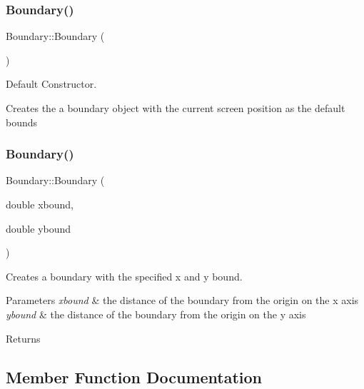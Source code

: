 \subsubsection{\texorpdfstring{Boundary()}{Boundary()}\hspace{0.1cm}{\footnotesize\ttfamily [1/2]}}
{\footnotesize\ttfamily Boundary\+::\+Boundary (\begin{DoxyParamCaption}{ }\end{DoxyParamCaption})}



Default Constructor. 

Creates the a boundary object with the current screen position as the default bounds \mbox{\label{class_boundary_a1ebdbcf1f4bfc6c98ec89e0f15754a59}} 
\subsubsection{\texorpdfstring{Boundary()}{Boundary()}\hspace{0.1cm}{\footnotesize\ttfamily [2/2]}}
{\footnotesize\ttfamily Boundary\+::\+Boundary (\begin{DoxyParamCaption}\item[{double}]{xbound,  }\item[{double}]{ybound }\end{DoxyParamCaption})}



Creates a boundary with the specified x and y bound. 


\begin{DoxyParams}{Parameters}
{\em xbound} & the distance of the boundary from the origin on the x axis \\
\hline
{\em ybound} & the distance of the boundary from the origin on the y axis \\
\hline
\end{DoxyParams}
\begin{DoxyReturn}{Returns}

\end{DoxyReturn}


\subsection{Member Function Documentation}
\mbox{\label{class_boundary_a10d2d43b80364ce04cb22b90c9b54493}} 
